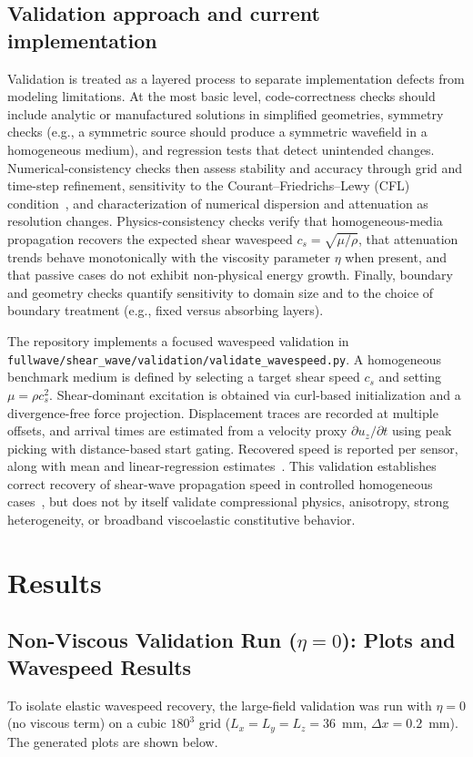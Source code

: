 \documentclass[11pt]{article}
\begin{document}
\subsection{Validation approach and current implementation}
\label{sec:validation_methods}
Validation is treated as a layered process to separate implementation defects from
modeling limitations. At the most basic level, code-correctness checks should include
analytic or manufactured solutions in simplified geometries, symmetry checks (e.g.,
a symmetric source should produce a symmetric wavefield in a homogeneous medium), and
regression tests that detect unintended changes. Numerical-consistency checks then
assess stability and accuracy through grid and time-step refinement, sensitivity to
the Courant--Friedrichs--Lewy (CFL) condition~\cite{courant1928partial}, and characterization of numerical
dispersion and attenuation as resolution changes. Physics-consistency checks verify
that homogeneous-media propagation recovers the expected shear wavespeed
$c_s=\sqrt{\mu/\rho}$, that attenuation trends behave monotonically with the viscosity
parameter $\eta$ when present, and that passive cases do not exhibit non-physical
energy growth. Finally, boundary and geometry checks quantify sensitivity to domain
size and to the choice of boundary treatment (e.g., fixed versus absorbing layers).

The repository implements a focused wavespeed validation in
\texttt{fullwave/shear\_wave/validation/validate\_wavespeed.py}. A homogeneous benchmark medium is
defined by selecting a target shear speed $c_s$ and setting $\mu=\rho c_s^2$.
Shear-dominant excitation is obtained via curl-based initialization and a
divergence-free force projection. Displacement traces are recorded at multiple
offsets, and arrival times are estimated from a velocity proxy
$\partial u_z/\partial t$ using peak picking with distance-based start gating.
Recovered speed is reported per sensor, along with mean and linear-regression
estimates~\cite{urban2012review,chen2013quantitative}. This validation establishes correct recovery of shear-wave propagation
speed in controlled homogeneous cases~\cite{capuzzi2018numerical}, but does not by itself validate compressional
physics, anisotropy, strong heterogeneity, or broadband viscoelastic constitutive
behavior.

\section{Results}\label{sec:results}
\subsection{Non-Viscous Validation Run (\texorpdfstring{$\eta=0$}{eta=0}): Plots and Wavespeed Results}
To isolate elastic wavespeed recovery, the large-field validation was run with $\eta=0$ (no viscous term) on a cubic $180^3$ grid ($L_x=L_y=L_z=36$~mm, $\Delta x=0.2$~mm). The generated plots are shown below.
\end{document}
